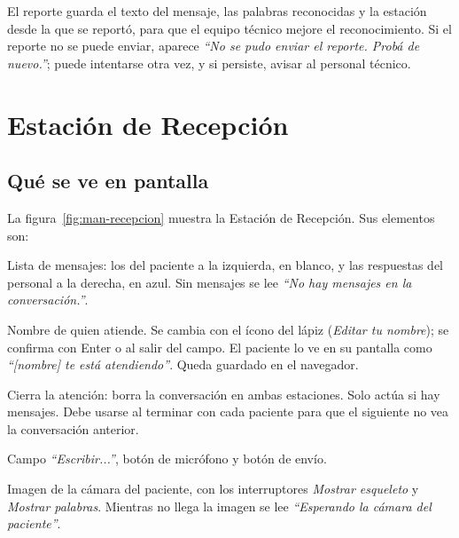 
El reporte guarda el texto del mensaje, las palabras reconocidas y la estación desde la que se reportó, para que el equipo técnico mejore el reconocimiento. Si el reporte no se puede enviar, aparece \emph{``No se pudo enviar el reporte. Probá de nuevo.''}; puede intentarse otra vez, y si persiste, avisar al personal técnico.

\section{Estación de Recepción}

\subsection{Qué se ve en pantalla}

La figura~\ref{fig:man-recepcion} muestra la Estación de Recepción. Sus elementos son:
\begin{description}[style=nextline, leftmargin=1.5em]
  \item[Conversación con paciente] Lista de mensajes: los del paciente a la izquierda, en blanco, y las respuestas del personal a la derecha, en azul. Sin mensajes se lee \emph{``No hay mensajes en la conversación.''}.
  \item[Tu nombre] Nombre de quien atiende. Se cambia con el ícono del lápiz (\emph{Editar tu nombre}); se confirma con Enter o al salir del campo. El paciente lo ve en su pantalla como \emph{``[nombre] te está atendiendo''}. Queda guardado en el navegador.
  \item[Finalizar atención] Cierra la atención: borra la conversación en ambas estaciones. Solo actúa si hay mensajes. Debe usarse al terminar con cada paciente para que el siguiente no vea la conversación anterior.
  \item[Cuadro de respuesta] Campo \emph{``Escribir...''}, botón de micrófono y botón de envío.
  \item[Cámara del paciente] Imagen de la cámara del paciente, con los interruptores \emph{Mostrar esqueleto} y \emph{Mostrar palabras}. Mientras no llega la imagen se lee \emph{``Esperando la cámara del paciente''}.
\end{description}


